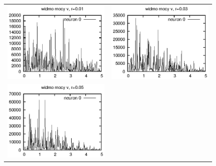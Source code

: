 \documentclass[12pt]{article}
\begin{document}
  \begin{figure}
  \centering
  \begin{tabular}{cc}
    \includegraphics{referat_graph/r001.eps} &
    \includegraphics{referat_graph/r003.eps} \\
    \includegraphics{referat_graph/r005.eps} & 

\end{tabular}
\end{figure}
\end{document}
